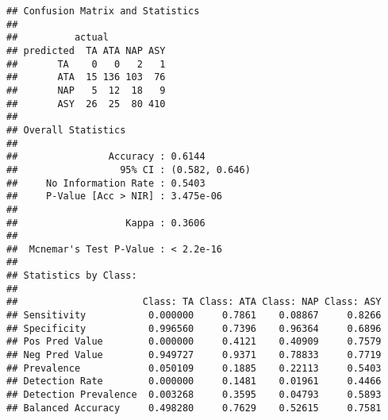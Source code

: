 \documentclass[
]{article}
\newenvironment{Shaded}{\begin{snugshade}}{\end{snugshade}}
\newcommand{\AttributeTok}[1]{\textcolor[rgb]{0.77,0.63,0.00}{#1}}
\newcommand{\CommentTok}[1]{\textcolor[rgb]{0.56,0.35,0.01}{\textit{#1}}}
\newcommand{\FunctionTok}[1]{\textcolor[rgb]{0.00,0.00,0.00}{#1}}
\newcommand{\NormalTok}[1]{#1}
\newcommand{\OtherTok}[1]{\textcolor[rgb]{0.56,0.35,0.01}{#1}}
\newcommand{\SpecialCharTok}[1]{\textcolor[rgb]{0.00,0.00,0.00}{#1}}
\begin{document}
\begin{verbatim}
## Confusion Matrix and Statistics
## 
##          actual
## predicted  TA ATA NAP ASY
##       TA    0   0   2   1
##       ATA  15 136 103  76
##       NAP   5  12  18   9
##       ASY  26  25  80 410
## 
## Overall Statistics
##                                         
##                Accuracy : 0.6144        
##                  95% CI : (0.582, 0.646)
##     No Information Rate : 0.5403        
##     P-Value [Acc > NIR] : 3.475e-06     
##                                         
##                   Kappa : 0.3606        
##                                         
##  Mcnemar's Test P-Value : < 2.2e-16     
## 
## Statistics by Class:
## 
##                      Class: TA Class: ATA Class: NAP Class: ASY
## Sensitivity           0.000000     0.7861    0.08867     0.8266
## Specificity           0.996560     0.7396    0.96364     0.6896
## Pos Pred Value        0.000000     0.4121    0.40909     0.7579
## Neg Pred Value        0.949727     0.9371    0.78833     0.7719
## Prevalence            0.050109     0.1885    0.22113     0.5403
## Detection Rate        0.000000     0.1481    0.01961     0.4466
## Detection Prevalence  0.003268     0.3595    0.04793     0.5893
## Balanced Accuracy     0.498280     0.7629    0.52615     0.7581
\end{verbatim}

\begin{Shaded}
\end{Shaded}
\end{document}
